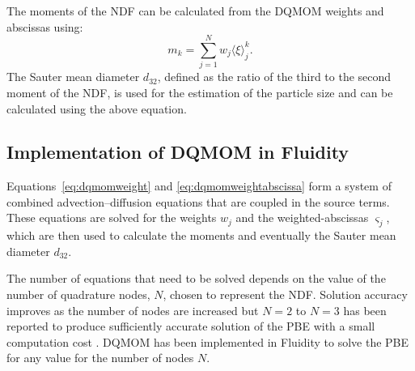 The moments of the NDF can be calculated from the DQMOM weights and abscissas using:
\begin{equation} \label{eq:moments_quad_wts_abs}
m_k = \sum_{j=1}^N w_{j} \langle \xi \rangle_{j}^k.
\end{equation}
The Sauter mean diameter $d_{32}$, defined as the ratio of the third to the second moment of the NDF, is used for the estimation of the particle size and can be calculated using the above equation.

\subsection{Implementation of DQMOM in Fluidity}
\label{DQMOM_implementation_Fluidity}
Equations~\eqref{eq:dqmomweight} and \eqref{eq:dqmomweightabscissa} form a system of combined advection--diffusion equations that are coupled in the source terms. 
These equations are solved for the weights $w_j$ and the weighted-abscissas $\varsigma_j$, which are then used to calculate the moments and eventually the Sauter mean diameter $d_{32}$.

The number of equations that need to be solved depends on the value of the number of quadrature nodes, $N$, chosen to represent the NDF. Solution accuracy improves as the number of nodes are increased but $N=2$ to $N=3$ has been reported to produce sufficiently accurate solution of the PBE  with a small computation cost \citep{marchisio2005solution}. 
DQMOM has been implemented in Fluidity to solve the PBE for any value for the number of nodes $N$.

